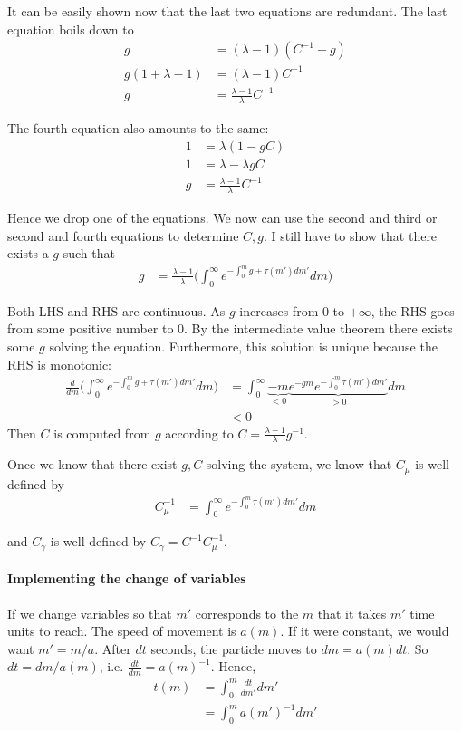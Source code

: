 \documentclass[12pt,english]{article}
\theoremstyle{remark}
\begin{document}
It can be easily shown now that the last two equations are redundant. The last equation boils down to 
\begin{align*}
	g &= (\lambda -1) (C^{-1} - g) \\
	g (1 + \lambda - 1) &= (\lambda -1) C^{-1} \\ 
	g &= \frac{\lambda -1}{\lambda} C^{-1}  
\end{align*}

The fourth equation also amounts to the same:
\begin{align*}
	1 &= \lambda(1 - gC) \\
	1 &= \lambda - \lambda g C\\
	g &= \frac{\lambda -1}{\lambda } C^{-1}
\end{align*}

Hence we drop one of the equations. We now can use the second and third or second and fourth equations to determine $C,g$. I still have to show that there exists a $g$ such that
\begin{align*}
	g &= \frac{\lambda -1}{\lambda} \Big( \int_{0}^{\infty} e^{-\int_0^m g + \tau(m') dm'} dm  \Big)
\end{align*}

Both LHS and RHS are continuous. As $g$ increases from $0$ to $+\infty$, the RHS goes from some positive number to 0. By the intermediate value theorem there exists some $g$ solving the equation. Furthermore, this solution is unique because the RHS is monotonic: 
\begin{align*}
	\frac{d}{dm} \Big( \int_{0}^{\infty} e^{-\int_0^m g + \tau(m') dm'} dm  \Big) &= \int_0^{\infty} \underbrace{-m}_{<0}\underbrace{e^{-gm} e^{-\int_0^m \tau(m') dm'}}_{> 0} dm  \\
	      &< 0
\end{align*}Then $C$ is computed from $g$ according to $C = \frac{\lambda - 1}{\lambda} g^{-1}$. 

Once we know that there exist $g,C$ solving the system, we know that $C_{\mu}$ is well-defined by 
\begin{align*}
	C_{\mu}^{-1} &=\int_0^{\infty} e^{-\int_0^m \tau(m')dm'} dm
\end{align*}

and $C_{\gamma}$ is well-defined by $C_{\gamma} = C^{-1} C_{\mu}^{-1}$. 

\paragraph{Implementing the change of variables}
If we change variables so that $m'$ corresponds to the $m$ that it takes $m'$ time units to reach. The speed of movement is $a(m)$. If it were constant, we would want $m' = m/a$. After $dt$ seconds, the particle moves to $dm = a(m)dt$. So $dt = dm/a(m)$, i.e. $\frac{dt}{dm} = a(m)^{-1}$. Hence, 
\begin{align*}
	t(m) &= \int_0^m \frac{dt}{dm'} dm' \\
	     &= \int_0^m a(m')^{-1} dm'
\end{align*}  
\end{document}
